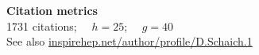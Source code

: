 \renewenvironment{spacelist} {
  \begin{list} {} {
    \setlength{\topsep}{-8 pt}
    \setlength{\itemsep}{5 pt}
    \setlength{\leftmargin}{-1.15 in}
  }
}{
  \end{list}
}

\raggedright

\begin{spacelist}
  \item {\large \bfseries Citation metrics} \\[6 pt]
  1731 citations; \ \ \href{https://en.wikipedia.org/wiki/H-index}{$h = 25$}; \ \ \href{https://en.wikipedia.org/wiki/G-index}{$g = 40$} \\[2 pt]
  See also \href{http://inspirehep.net/author/profile/D.Schaich.1}{inspirehep.net/author/profile/D.Schaich.1} \\[15 pt]


\end{spacelist}

